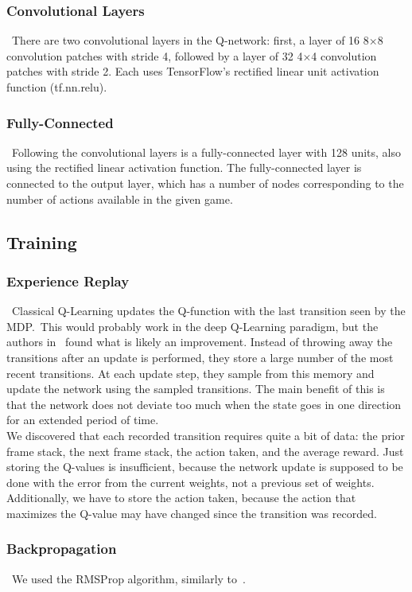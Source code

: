 \documentclass[conference]{IEEEtran}
\begin{document}
\subsubsection{Convolutional Layers}
\noindent\ There are two convolutional layers in the Q-network: first, a layer
of 16 8$\times$8 convolution patches with stride 4, followed by a layer of 32
4$\times$4 convolution patches with stride 2. Each uses TensorFlow's rectified
linear unit activation function (tf.nn.relu).

\subsubsection{Fully-Connected}
\noindent\ Following the convolutional layers is a fully-connected layer with
128 units, also using the rectified linear activation function. The
fully-connected layer is connected to the output layer, which has a number of
nodes corresponding to the number of actions available in the given game.

\subsection{Training}
\subsubsection{Experience Replay}
\noindent\ Classical Q-Learning updates the Q-function with the last transition
seen by the MDP.\ This would probably work in the deep Q-Learning paradigm, but
the authors in~\cite{mnih2013playing} found what is likely an improvement.
Instead of throwing away the transitions after an update is performed, they
store a large number of the most recent transitions. At each update step, they
sample from this memory and update the network using the sampled transitions.
The main benefit of this is that the network does not deviate too much when the
state goes in one direction for an extended period of time.\\
\indent We discovered that each recorded transition requires quite a bit of
data: the prior frame stack, the next frame stack, the action taken, and the
average reward. Just storing the Q-values is insufficient, because the network
update is supposed to be done with the error from the current weights, not a
previous set of weights. Additionally, we have to store the action taken,
because the action that maximizes the Q-value may have changed since the
transition was recorded.

\subsubsection{Backpropagation}
\noindent\ We used the RMSProp algorithm, similarly to~\cite{mnih2013playing}.
\end{document}
